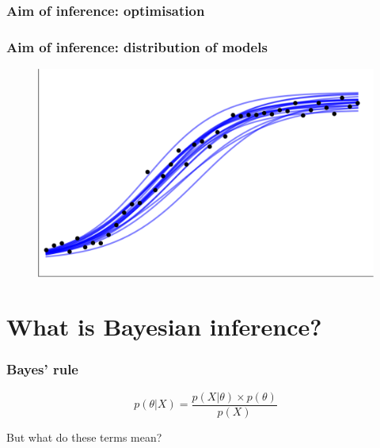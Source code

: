 \documentclass[handout]{beamer}
\begin{document}
\begin{frame}
	\frametitle{Aim of inference: optimisation}
	
	\begin{figure}[t]
		\centerline{}
	\end{figure}
\end{frame}

\begin{frame}
	\frametitle{Aim of inference: distribution of models}
	
		\begin{figure}[ht]
			\includegraphics[width=1\textwidth]{./Animations/inference_sampling.png}
		\end{figure}
\end{frame}

\section{What is Bayesian inference?}

\frame{\tableofcontents[currentsection]}

\begin{frame}
	\frametitle{Bayes' rule}
	\begin{equation}
	p(\theta|X) = \frac{p(X|\theta)\times p(\theta)}{p(X)}
	\end{equation}
	
	But what do these terms mean?
\end{frame}
\end{document}
